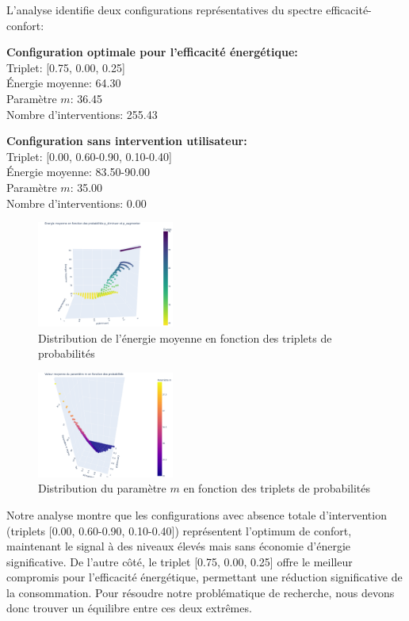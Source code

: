 \documentclass[a4paper,11pt]{article}
\begin{document}
L'analyse identifie deux configurations représentatives du spectre efficacité-confort:

\begin{mdframed}
\textbf{Configuration optimale pour l'efficacité énergétique:}\\
Triplet: [0.75, 0.00, 0.25]\\
Énergie moyenne: 64.30\\
Paramètre $m$: 36.45 \\
Nombre d'interventions: 255.43

\textbf{Configuration sans intervention utilisateur:}\\
Triplet: [0.00, 0.60-0.90, 0.10-0.40]\\
Énergie moyenne: 83.50-90.00\\
Paramètre $m$: 35.00 \\
Nombre d'interventions: 0.00
\end{mdframed}

\begin{figure}[h]
    \centering
    \includegraphics[width=0.4\textwidth]{figures/exp1-enM.png}
    \caption{Distribution de l'énergie moyenne en fonction des triplets de probabilités}
    \label{fig:energie_3d}
\end{figure}

\begin{figure}[h]
    \centering
    \includegraphics[width=0.4\textwidth]{figures/exp1-intM.png}
    \caption{Distribution du paramètre $m$ en fonction des triplets de probabilités}
    \label{fig:parametre_m_3d}
\end{figure}
Notre analyse montre que les configurations avec absence totale d'intervention (triplets [0.00, 0.60-0.90, 0.10-0.40]) représentent l'optimum de confort, maintenant le signal à des niveaux élevés mais sans économie d'énergie significative. De l'autre côté, le triplet [0.75, 0.00, 0.25] offre le meilleur compromis pour l'efficacité énergétique, permettant une réduction significative de la consommation. Pour résoudre notre problématique de recherche, nous devons donc trouver un équilibre entre ces deux extrêmes.
\end{document}

